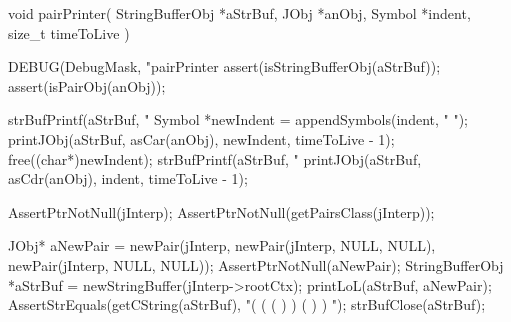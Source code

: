 \startCCode
void pairPrinter(
  StringBufferObj *aStrBuf,
  JObj            *anObj,
  Symbol          *indent,
  size_t           timeToLive
) {
  DEBUG(DebugMask, "pairPrinter %
  assert(isStringBufferObj(aStrBuf));
  assert(isPairObj(anObj));
  
  strBufPrintf(aStrBuf, "%
  Symbol *newIndent = appendSymbols(indent, "  ");
  printJObj(aStrBuf, asCar(anObj), newIndent, timeToLive - 1);
  free((char*)newIndent);
  strBufPrintf(aStrBuf, "%
  printJObj(aStrBuf, asCdr(anObj), indent, timeToLive - 1);
}
\stopCCode


\startCTest
  AssertPtrNotNull(jInterp);
  AssertPtrNotNull(getPairsClass(jInterp));

  JObj* aNewPair = newPair(jInterp,
                               newPair(jInterp, NULL, NULL),
                               newPair(jInterp, NULL, NULL));
  AssertPtrNotNull(aNewPair);
  StringBufferObj *aStrBuf = newStringBuffer(jInterp->rootCtx);
  printLoL(aStrBuf, aNewPair);
  AssertStrEquals(getCString(aStrBuf), "( ( ( ) ) ( ) ) ");
  strBufClose(aStrBuf);
\stopCTest
\skipTestCase
\stopTestSuite

